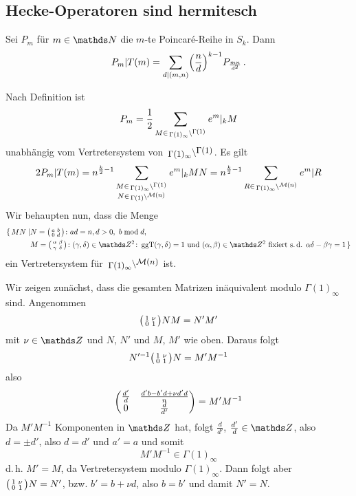 \subsection{Hecke-Operatoren sind hermitesch}

\begin{satz}
Sei $P_m$ für $m \in \NN$ die $m$-te Poincaré-Reihe in $S_k$.
Dann
\[
P_m | T(m) = \sum_{d | (m,n)} \Bigl( \frac{n}{d} \Bigr)^{k-1} P_{\frac{mn}{d^2}}
\,.
\]
\end{satz}
\begin{bewe}
Nach Definition ist
\[
P_m = \frac{1}{2} \sum_{M\in \linksmodulo{\Gamma(1)_\infty}{\Gamma(1)}} e^m |_k M
\]
unabhängig vom Vertretersystem von $\linksmodulo{\Gamma(1)_\infty}{\Gamma(1)}$.
Es gilt
\[
2 P_m | T(m) = n^{\frac{k}{2}-1} \sum_{\substack{M \in \linksmodulo{\Gamma(1)_\infty}{\Gamma(1)}\\ N \in \linksmodulo{\Gamma(1)}{\mathcal{M}(n)}}} e^m|_k MN
= n^{\frac{k}{2}-1} \sum_{R \in \linksmodulo{\Gamma(1)_\infty}{\mathcal{M}(n)}} e^m|R
\]
Wir behaupten nun, dass die Menge 
\begin{equation*}
\begin{split}
\{\,MN \mid &N = \mymat ab0d\colon ad=n, d>0,\ b \bmod d, \\ &M = \mymat \alpha\beta\gamma\delta\colon (\gamma, \delta) \in \ZZ^2\colon \ggt(\gamma, \delta) = 1 \text{ und } (\alpha, \beta) \in \ZZ^2 \text{ fixiert s.\,d. } \alpha\delta - \beta\gamma = 1\,\}
\end{split}
\end{equation*}
ein Vertretersystem für $\linksmodulo{\Gamma(1)_\infty}{\mathcal{M}(n)}$ ist.

Wir zeigen zunächst, dass die gesamten Matrizen inäquivalent modulo $\Gamma(1)_\infty$ sind.
Angenommen
\[
\mymat 1\nu01 NM = N'M'
\]
mit $\nu \in \ZZ$ und $N$, $N'$ und $M$, $M'$ wie oben.
Daraus folgt
\[
N'^{-1} \mymat 1\nu01 N = M'M^{-1}
\]
also
\[
\mymat*{\frac{d'}{d}}{\frac{d'b-b'd+\nu d'd}{n}}{0}{\frac{d}{d'}}
= M' M^{-1}
\]
Da $M'M^{-1}$ Komponenten in $\ZZ$ hat, folgt $\frac{d}{d'}$, $\frac{d'}{d} \in \ZZ$, also $d = \pm d'$, also $d = d'$ und $a' = a$ und somit 
\[
M'M^{-1} \in \Gamma(1)_\infty
\]
d.\,h. $M' = M$, da Vertretersystem modulo $\Gamma(1)_\infty$.
Dann folgt aber $\mymat 1\nu01 N = N'$, bzw. $b' = b + \nu d$, also $b = b'$ und damit $N' = N$.
\end{bewe}